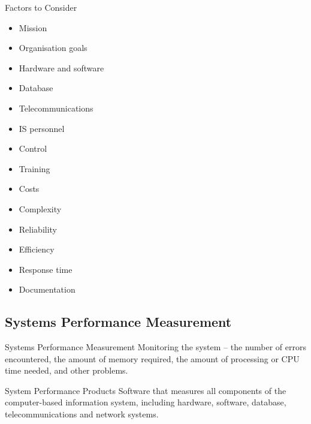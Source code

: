 \documentclass[\main/notes.tex]{subfiles}
\begin{document}
			\begin{sidenote}{Factors to Consider}
				\begin{multicols}{3}
					\begin{itemize}[nosep]
						\item Mission
						\item Organisation goals
						\item Hardware and software
						\item Database
						\item Telecommunications
						\item IS personnel
						\item Control
						\item Training
						\item Costs
						\item Complexity
						\item Reliability
						\item Efficiency
						\item Response time
						\item Documentation
					\end{itemize}
				\end{multicols}
			\end{sidenote}
			\subsection{Systems Performance Measurement}
				\begin{definition}{Systems Performance Measurement}
					Monitoring the system -- the number of errors encountered, the amount of memory required, the amount of processing or CPU time needed, and other problems.
				\end{definition}
				\begin{definition}{System Performance Products}
					Software that measures all components of the computer-based information system, including hardware, software, database, telecommunications and network systems.
				\end{definition}
\end{document}
